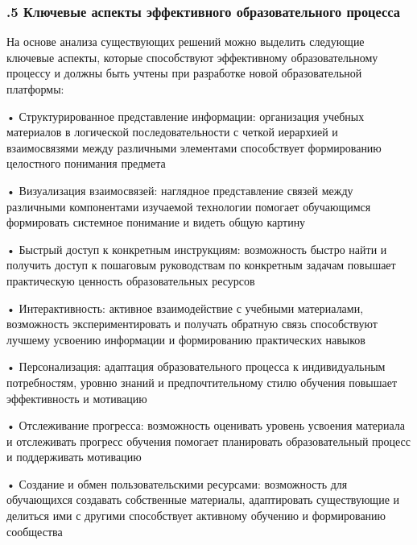 \subtitlespace

\subsubsection*{ 
  \gostTitleFont
  .5 Ключевые аспекты эффективного образовательного процесса
} 

\subtitlespace

{\gostFont
  
  \par \redline На основе анализа существующих решений можно выделить следующие ключевые аспекты, которые способствуют эффективному образовательному процессу и должны быть учтены при разработке новой образовательной платформы:
  
  \par \redline • Структурированное представление информации: организация учебных материалов в логической последовательности с четкой иерархией и взаимосвязями между различными элементами способствует формированию целостного понимания предмета
  
  \par \redline • Визуализация взаимосвязей: наглядное представление связей между различными компонентами изучаемой технологии помогает обучающимся формировать системное понимание и видеть общую картину
  
  \par \redline • Быстрый доступ к конкретным инструкциям: возможность быстро найти и получить доступ к пошаговым руководствам по конкретным задачам повышает практическую ценность образовательных ресурсов
  
  \par \redline • Интерактивность: активное взаимодействие с учебными материалами, возможность экспериментировать и получать обратную связь способствуют лучшему усвоению информации и формированию практических навыков
  
  \par \redline • Персонализация: адаптация образовательного процесса к индивидуальным потребностям, уровню знаний и предпочтительному стилю обучения повышает эффективность и мотивацию
  
  \par \redline • Отслеживание прогресса: возможность оценивать уровень усвоения материала и отслеживать прогресс обучения помогает планировать образовательный процесс и поддерживать мотивацию
  
  \par \redline • Создание и обмен пользовательскими ресурсами: возможность для обучающихся создавать собственные материалы, адаптировать существующие и делиться ими с другими способствует активному обучению и формированию сообщества
  
}
